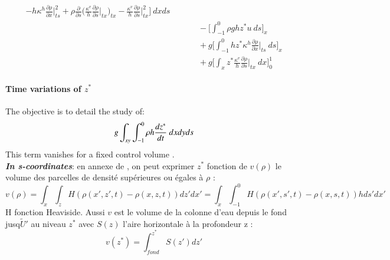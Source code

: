 \begin{subequations}
\begin{alignat}{2}
-  h \kappa^h \frac{\partial \rho}{\partial x}\bigg\rvert_{ts}^2
+ \rho \frac{\partial}{\partial s} \bigg(\frac{\kappa^v}{h} \frac{\partial \rho}{\partial s}\bigg\rvert_{tx}\bigg)_{tx} 
- \frac{\kappa^v}{h} \frac{\partial \rho}{\partial s}\bigg\rvert_{tx}^2
\bigg] \ dx ds \\
& && \quad - \bigg[ \int_{-1}^0 \rho g h z^* u \ ds\bigg]_{x}\\ 
& && \quad + g\bigg[ \int_{-1}^0 h z^* \kappa^h \frac{\partial \rho}{\partial x}\bigg\rvert_{ts} \ ds \bigg]_{x}\\
& && \quad + g\bigg[ \int_x z^* \frac{\kappa^v}{h} \frac{\partial \rho}{\partial s}\bigg\rvert_{tx} \ dx \bigg]_0^1
  \end{alignat}
\end{subequations}

\paragraph{Time variations of $z^*$}

The objective is to detail the study of:
\begin{equation}
g\int_{xy} \int_{-1}^0 \rho h \frac{d z^*}{d t}\ dxdy ds \\
\end{equation}
This term vanishes for a fixed control volume \citep{huang_mixing_1998}.\\

\textbf{\textit{In s-coordinates}}: en annexe de \citep{huang_mixing_1998}, on peut exprimer $z^*$ fonction de $v(\rho)$ le volume des parcelles de densité supérieures ou égales à $\rho$ :
\begin{equation}
v(\rho)=\int_x\int_z H(\rho(x',z',t)-\rho(x,z,t))dz'dx' = \int_x\int_{-1}^0 H(\rho(x',s',t)-\rho(x,s,t))h ds'dx'
\end{equation}
H fonction Heaviside. Aussi $v$ est le volume de la colonne d'eau depuis le fond jusq$\tilde{U}'$ au niveau $z^*$ avec $S(z)$ l'aire horizontale à la profondeur z :
\begin{equation}
v(z^*)=\int^{z^*}_{fond} S(z')dz'
\end{equation}

